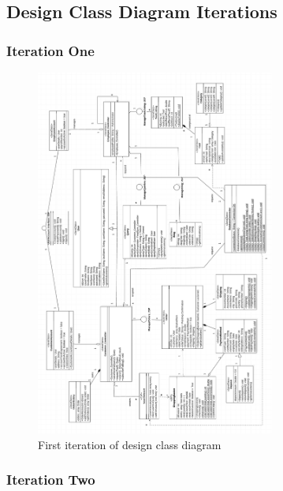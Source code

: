 \subsection{Design Class Diagram Iterations}


\subsubsection{Iteration One}

\begin{figure}[H]
      \centering
      \includegraphics[trim = 0 0 0 0, clip, width=0.7\textwidth]{TempImg/DClass1.png}
      \caption{First iteration of design class diagram}
\end{figure}

\subsubsection{Iteration Two}

